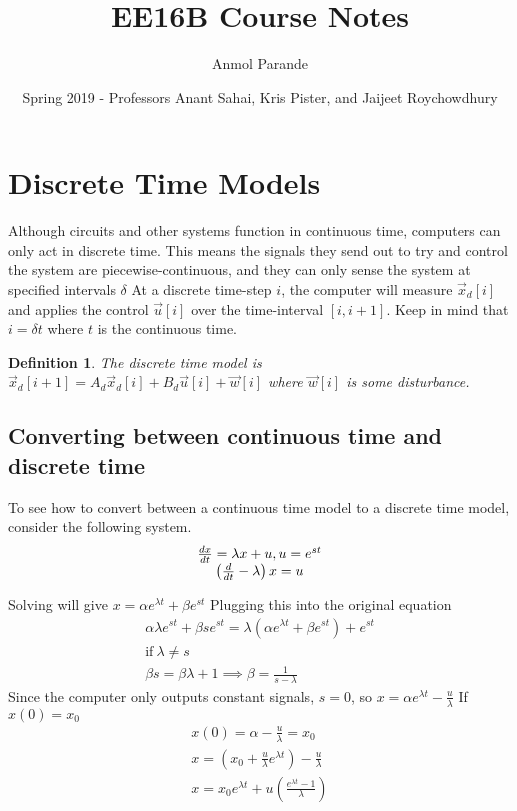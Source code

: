 \documentclass{article}
\newtheorem{definition}{Definition}
\begin{document}
\title{EE16B Course Notes}
\author{Anmol Parande}
\date{Spring 2019 - Professors Anant Sahai, Kris Pister, and Jaijeet Roychowdhury}
\maketitle
\section{Discrete Time Models}
Although circuits and other systems function in continuous time, computers can only act in discrete time.
This means the signals they send out to try and control the system are piecewise-continuous, and they can only sense the system at specified intervals $\delta$
At a discrete time-step $i$, the computer will measure $\vec{x}_d[i]$ and applies the control $\vec{u}[i]$ over the time-interval $[i, i+1]$.
Keep in mind that $i=\delta t$ where $t$ is the continuous time.

\begin{definition}
    The discrete time model is $\vec{x}_d[i+1]=A_d\vec{x}_d[i]+B_d\vec{u}[i]+\vec{w}[i]$ where $\vec{w}[i]$ is some disturbance.
\end{definition}

\subsection{Converting between continuous time and discrete time}
To see how to convert between a continuous time model to a discrete time model, consider the following system.
\[
    \begin{array}{c}
        \frac{dx}{dt}=\lambda x+u, u=e^{st}\\
        \left(
            \frac{d}{dt}-\lambda
            \right)x = u
    \end{array}\\
\]

Solving will give $x=\alpha e^{\lambda t}+\beta e^{st}$
Plugging this into the original equation
\[
    \begin{array}{c}
        \alpha \lambda e^{st}+\beta se^{st} = \lambda (\alpha e^{\lambda t}+\beta e^{st})+e^{st}\\
        \text{if}\> \lambda \ne s\\
        \beta s = \beta \lambda + 1 \implies \beta = \frac{1}{s-\lambda}
    \end{array}
    \]
Since the computer only outputs constant signals, $s=0$, so $x=\alpha e^{\lambda t}-\frac{u}{\lambda}$
If $x(0)=x_0$
\[
    \begin{array}{c}
        x(0)=\alpha - \frac{u}{\lambda}=x_0\\
        x = (x_0+\frac{u}{\lambda}e^{\lambda t})-\frac{u}{\lambda}\\
        x = x_0 e^{\lambda t}+u\left(
            \frac{e^{\lambda t}-1}{\lambda}
        \right)
    \end{array}
\]
\end{document}
